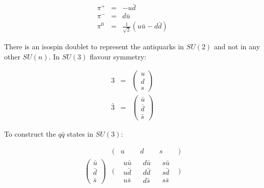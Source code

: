 \begin{eqnarray*}
  \pi^+ & = & -u\bar{d} \\
  \pi^- & = & d\bar{u} \\
  \pi^0 & = & \frac{1}{\sqrt{2}}\left( u\bar{u} - d\bar{d} \right)
\end{eqnarray*}

There is an isospin doublet to represent the antiquarks in $SU(2)$ and not in any other $SU(n)$.  In $SU(3)$ flavour symmetry:

\begin{eqnarray*}
  3 & = &
  \left(
    \begin{array}{c}
    u \\
    d \\
    s
    \end{array}
  \right)
  \\
  \bar{3} & = &
  \left(
    \begin{array}{c}
    \bar{u} \\
    \bar{d} \\
    \bar{s}
    \end{array}
  \right)
\end{eqnarray*}

To construct the $q\bar{q}$ states in $SU(3)$:

\[
  \begin{array}{cccccc}
    & ( & u & d & s & ) \\
    \left(
    \begin{array}{c}
      \bar{u} \\
      \bar{d} \\
      \bar{s}
    \end{array}
    \right)
    &
    \Bigg(
    &
    \begin{array}{c}
      u\bar{u} \\
      u\bar{d} \\
      u\bar{s}
    \end{array}
    &
    \begin{array}{c}
      d\bar{u} \\
      d\bar{d} \\
      d\bar{s}
    \end{array}
    &
    \begin{array}{c}
      s\bar{u} \\
      s\bar{d} \\
      s\bar{s}
    \end{array}
    &
    \Bigg)
  \end{array}
\]

